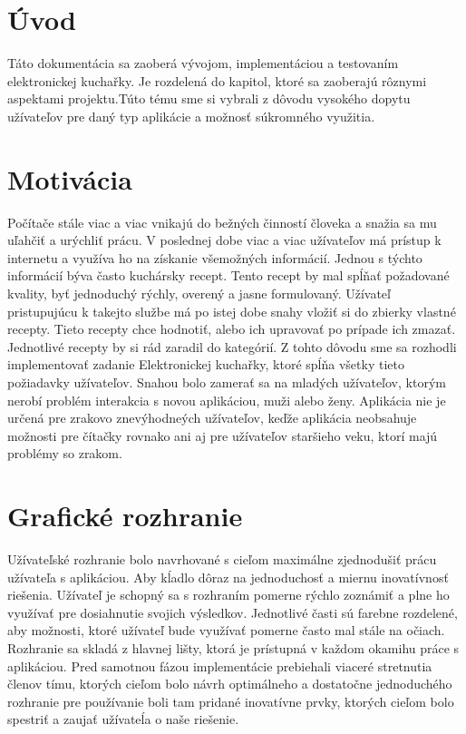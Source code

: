\documentclass[12pt,a4paper,titlepage,final]{article}
\begin{document}


\tableofcontents
\newpage

\section{Úvod}
Táto dokumentácia sa zaoberá vývojom, implementáciou a testovaním elektronickej kuchařky. Je rozdelená do kapitol, ktoré sa zaoberajú rôznymi aspektami projektu.Túto tému sme si vybrali z dôvodu vysokého dopytu užívateľov pre daný typ aplikácie a možnosť súkromného využitia. 


\section{Motivácia}
Počítače stále viac a viac vnikajú do bežných činností človeka a snažia sa mu uľahčiť a urýchliť prácu. V poslednej dobe viac a viac užívateľov má prístup k internetu a využíva ho na získanie všemožných informácií. Jednou s týchto informácií býva často kuchársky recept. Tento recept by mal spĺňať požadované kvality, byť jednoduchý rýchly, overený a jasne formulovaný. Užívateľ pristupujúcu k takejto službe má po istej dobe snahy vložiť si do zbierky vlastné recepty. Tieto recepty chce hodnotiť, alebo ich upravovať po prípade ich zmazať. Jednotlivé recepty by si rád zaradil do kategórií. Z tohto dôvodu sme sa rozhodli implementovať zadanie Elektronickej kuchařky, ktoré spĺňa všetky tieto požiadavky užívateľov. Snahou bolo zamerať sa na mladých užívateľov, ktorým nerobí problém interakcia s novou aplikáciou, muži alebo ženy. Aplikácia nie je určená pre zrakovo znevýhodneých užívateľov, keďže aplikácia neobsahuje možnosti pre čítačky rovnako ani aj pre užívateľov staršieho veku, ktorí majú problémy so zrakom.

\section{Grafické rozhranie}
Užívateľské rozhranie bolo navrhované s cieľom maximálne zjednodušiť prácu užívateľa s aplikáciou. Aby kĺadlo dôraz na jednoduchosť a miernu inovatívnosť riešenia. Užívateľ je schopný sa s rozhraním pomerne rýchlo zoznámiť a plne ho využívať pre dosiahnutie svojich výsledkov. Jednotlivé časti sú farebne rozdelené, aby možnosti, ktoré užívateľ bude využívať pomerne často mal stále na očiach. Rozhranie sa skladá z hlavnej lišty, ktorá je prístupná v každom okamihu práce s aplikáciou. Pred samotnou fázou implementácie prebiehali viaceré stretnutia členov tímu, ktorých cieľom bolo návrh optimálneho a dostatočne jednoduchého rozhranie pre používanie boli tam pridané inovatívne prvky, ktorých cieľom bolo spestriť a zaujať užívateĺa o naše riešenie.\cite{Stephen:Rozhrania}
\end{document}
